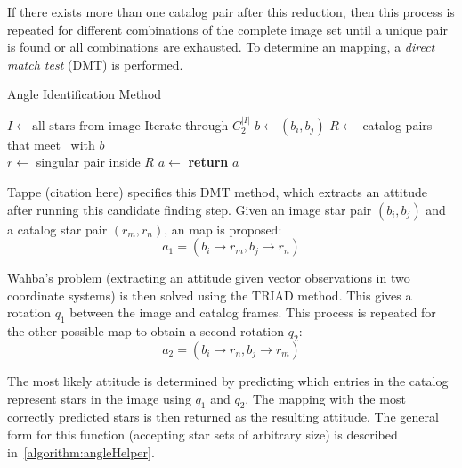 If there exists more than one catalog pair after this reduction, then this process is repeated for
different combinations of the complete image set until a unique pair is found or all combinations are exhausted.
To determine an mapping, a \textit{direct match test} (DMT) is performed.

\begin{algorithm}
    \caption{Angle Identification Method} \label{algorithm:angleIdentification}
    \begin{algorithmic}[1]
        \State $I \gets \text{all stars} \text{ from image}$
         \Comment Iterate through $C^{|I|}_2$
        \State $b \gets (b_i, b_j)$
        \State $R \gets $ catalog pairs that meet~ with $b$
        \\
        \State $r \gets $ singular pair inside $R$
        \State $a \gets $ 
        \State \textbf{return} $a$
        \EndIf
        \EndFor
        \EndFor
        \EndProcedure
    \end{algorithmic}
\end{algorithm}

Tappe (citation here) specifies this DMT method, which extracts an attitude after running this candidate finding step.
Given an image star pair $(b_i, b_j)$ and a catalog star pair $(r_m, r_n)$, an map is proposed:
\begin{equation}
    a_1 = (b_i \rightarrow r_m, b_j \rightarrow r_n)
\end{equation}

Wahba's problem (extracting an attitude given vector observations in two coordinate systems) is then solved using the
TRIAD method.
This gives a rotation $q_1$ between the image and catalog frames.
This process is repeated for the other possible map to obtain a second rotation $q_2$:
\begin{equation}
    a_2 = (b_i \rightarrow r_n, b_j \rightarrow r_m)
\end{equation}

The most likely attitude is determined by predicting which entries in the catalog represent stars in the image using
$q_1$ and $q_2$.
The mapping with the most correctly predicted stars is then returned as the resulting attitude.
The general form for this function (accepting star sets of arbitrary size) is described
in~\autoref{algorithm:angleHelper}.

